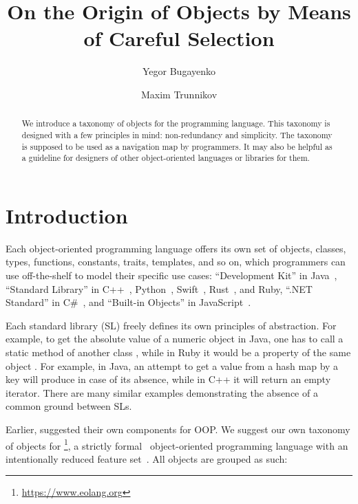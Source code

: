 \documentclass[sigplan,nonacm]{acmart}
\title{On the Origin of Objects by Means of Careful Selection}
\author{Yegor Bugayenko}
\affiliation{
  \institution{Huawei}
  \country{Russia}
  \city{Moscow}
}
\author{Maxim Trunnikov}
\affiliation{
  \institution{Huawei}
  \country{Russia}
  \city{Moscow}
}
\begin{document}
\begin{abstract}
We introduce a taxonomy of objects for the \eolang{} programming language.
This taxonomy is designed with a few principles in mind: non-redundancy and simplicity.
The taxonomy is supposed to be used as a navigation map by \eolang{} programmers.
It may also be helpful as a guideline for designers of other object-oriented languages or libraries for them.
\end{abstract}

\maketitle

\section{Introduction}

Each object-oriented programming language offers its own set of objects, classes, types, functions, constants, traits, templates, and so on, which programmers can use off-the-shelf to model their specific use cases:
``Development Kit'' in Java~\citep{jdk2024,jdk8},
``Standard Library'' in
  C++~\citep{cpp2024,josuttis2012cpp},
  Python~\citep{python2024,hellmann2017python},
  Swift~\citep{swift2024,deitel2015swift},
  Rust~\citep{rust2024,blandy2021rust},
  and
  Ruby,
``.NET Standard'' in C\#~\citep{net2023,abrams2005net},
and ``Built-in Objects'' in JavaScript~\citep{js2024,crockford2008js}.

Each standard library (SL) freely defines its own principles of abstraction.
For example, to get the absolute value of a numeric object  in Java, one has to call a static method of another class , while in Ruby it would be a property of the same object .
For example, in Java, an attempt to get a value from a hash map by a key will produce  in case of its absence, while in C++ it will return an empty iterator.
There are many similar examples demonstrating the absence of a common ground between SLs.

Earlier, \citet{booch1990design} suggested their own components for OOP.
We suggest our own taxonomy of objects for \eolang{}\footnote{\url{https://www.eolang.org}}, a strictly formal~\citep{kudasov2022formalizing} object-oriented programming language with an intentionally reduced feature set~\citep{bugayenko2021eolang}.
All objects are grouped as such:
\end{document}
